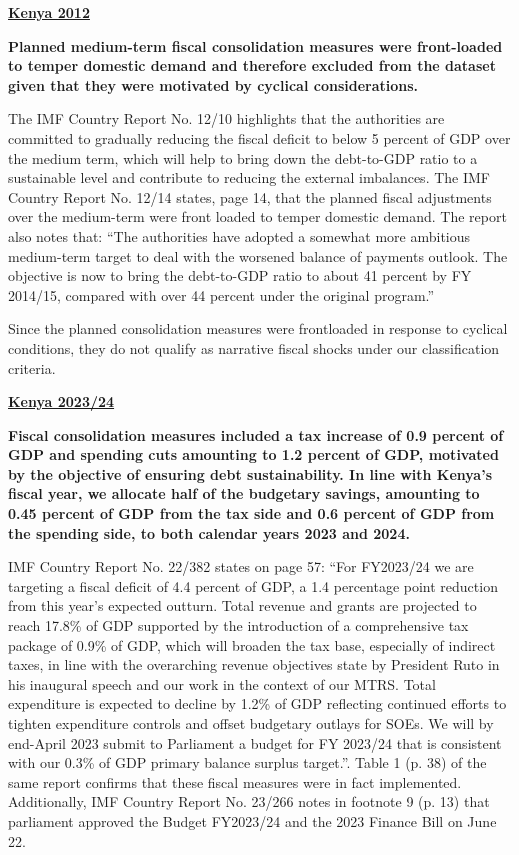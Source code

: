 \textbf{\underline{Kenya 2012}}

\textbf{Planned medium-term fiscal consolidation measures were front-loaded to temper domestic demand and therefore excluded from the dataset given that they were motivated by cyclical considerations.}

The IMF Country Report No. 12/10 highlights that the authorities are committed to gradually reducing the fiscal deficit to below 5 percent of GDP over the medium term, which will help to bring down the debt-to-GDP ratio to a sustainable level and contribute to reducing the external imbalances. The IMF Country Report No. 12/14 states, page 14, that the planned fiscal adjustments over the medium-term were front loaded to temper domestic demand. The report also notes that: “The authorities have adopted a somewhat more ambitious medium-term target to deal with the worsened balance of payments outlook. The objective is now to bring the debt-to-GDP ratio to about 41 percent by FY 2014/15, compared with over 44 percent under the original program.”

Since the planned consolidation measures were frontloaded in response to cyclical conditions, they do not qualify as narrative fiscal shocks under our classification criteria.

\textbf{\underline{Kenya 2023/24}}

\textbf{Fiscal consolidation measures included a tax increase of 0.9 percent of GDP and spending cuts amounting to 1.2 percent of GDP, motivated by the objective of ensuring debt sustainability. In line with Kenya's fiscal year, we allocate half of the budgetary savings, amounting to 0.45 percent of GDP from the tax side and 0.6 percent of GDP from the spending side, to both calendar years 2023 and 2024.}

IMF Country Report No. 22/382 states on page 57: “For FY2023/24 we are targeting a fiscal deficit of 4.4 percent of GDP, a 1.4 percentage point reduction from this year’s expected outturn. Total revenue and grants are projected to reach 17.8\% of GDP supported by the introduction of a comprehensive tax package of 0.9\% of GDP, which will broaden the tax base, especially of indirect taxes, in line with the overarching revenue objectives state by President Ruto in his inaugural speech and our work in the context of our MTRS. Total expenditure is expected to decline by 1.2\% of GDP reflecting continued efforts to tighten expenditure controls and offset budgetary outlays for SOEs. We will by end-April 2023 submit to Parliament a budget for FY 2023/24 that is consistent with our 0.3\% of GDP primary balance surplus target.”. Table 1 (p. 38) of the same report confirms that these fiscal measures were in fact implemented. Additionally, IMF Country Report No. 23/266 notes in footnote 9 (p. 13) that parliament approved the Budget FY2023/24 and the 2023 Finance Bill on June 22. 

